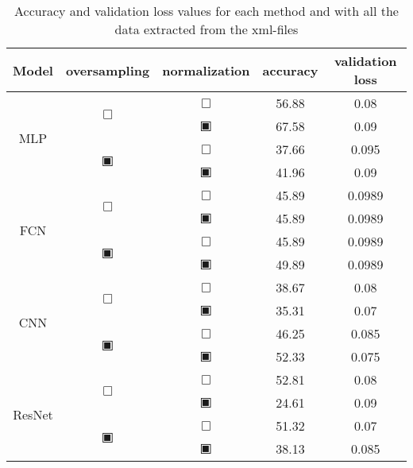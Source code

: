 \begin{table}[H]
	\renewcommand{\arraystretch}{.75}
	\begin{tabular}{|c|c|c|c|c|}
		\hline
		Model & oversampling & normalization & accuracy & validation loss\\
		\hline\hline
		\multirow{4}{*}{MLP}& \multirow{2}{*}{$\Box$} & $\Box$ & 56.88 & 0.08\\\cline{4-5}
				    &                         & $\blackinwhitesquare$ & 67.58 & 0.09\\\cline{3-5}
				    & \multirow{2}{*}{$\blackinwhitesquare$} & $\Box$ & 37.66 & 0.095\\\cline{4-5}
				    &                         & $\blackinwhitesquare$ & 41.96 & 0.09\\\cline{2-5}
		\hline\hline
		\multirow{4}{*}{FCN}& \multirow{2}{*}{$\Box$} & $\Box$ & 45.89 & 0.0989\\\cline{4-5}
				    &                         & $\blackinwhitesquare$ & 45.89 & 0.0989\\\cline{3-5}
				    & \multirow{2}{*}{$\blackinwhitesquare$} & $\Box$ & 45.89 & 0.0989\\\cline{4-5}
				    &                         & $\blackinwhitesquare$ & 49.89 & 0.0989\\\cline{2-5}
		\hline\hline
		\multirow{4}{*}{CNN}& \multirow{2}{*}{$\Box$} & $\Box$ & 38.67 & 0.08\\\cline{4-5}
				    &                         & $\blackinwhitesquare$ & 35.31 & 0.07\\\cline{3-5}
				    & \multirow{2}{*}{$\blackinwhitesquare$} & $\Box$ & 46.25 & 0.085\\\cline{4-5}
				    &                         & $\blackinwhitesquare$ & 52.33 & 0.075\\\cline{2-5}
		\hline\hline
		\multirow{4}{*}{ResNet}& \multirow{2}{*}{$\Box$} & $\Box$ & 52.81 & 0.08\\\cline{4-5}
				       &                         & $\blackinwhitesquare$ & 24.61 & 0.09\\\cline{3-5}
				       & \multirow{2}{*}{$\blackinwhitesquare$} & $\Box$ & 51.32 & 0.07\\\cline{4-5}
				       &                         & $\blackinwhitesquare$ & 38.13 & 0.085\\\cline{2-5}
		\hline\hline
	\end{tabular}
	\caption{Accuracy and validation loss values for each method and with all the data extracted from the xml-files}
	\label{tab:results-experiments-raw-all}
\end{table}
